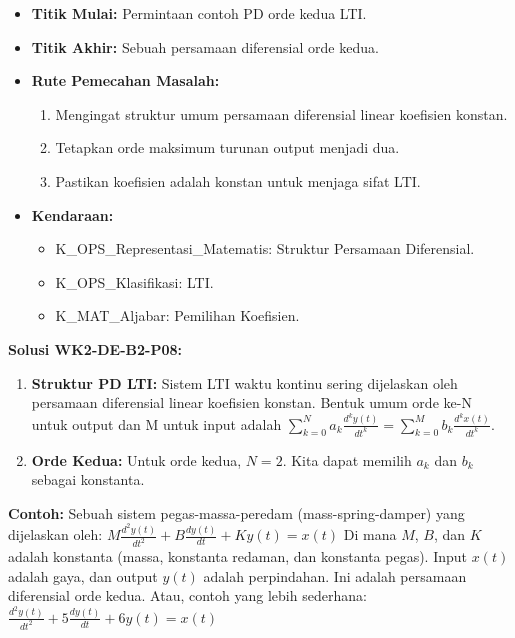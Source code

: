 \documentclass[
  letterpaper,
  DIV=11,
  numbers=noendperiod]{scrreprt}
\providecommand{\tightlist}{%
  \setlength{\itemsep}{0pt}\setlength{\parskip}{0pt}}
\begin{document}
\begin{itemize}
\tightlist
\item
  \textbf{Titik Mulai:} Permintaan contoh PD orde kedua LTI.
\item
  \textbf{Titik Akhir:} Sebuah persamaan diferensial orde kedua.
\item
  \textbf{Rute Pemecahan Masalah:}

  \begin{enumerate}
  \def\labelenumi{\arabic{enumi}.}
  \tightlist
  \item
    Mengingat struktur umum persamaan diferensial linear koefisien
    konstan.
  \item
    Tetapkan orde maksimum turunan output menjadi dua.
  \item
    Pastikan koefisien adalah konstan untuk menjaga sifat LTI.
  \end{enumerate}
\item
  \textbf{Kendaraan:}

  \begin{itemize}
  \tightlist
  \item
    K\_OPS\_Representasi\_Matematis: Struktur Persamaan Diferensial.
  \item
    K\_OPS\_Klasifikasi: LTI.
  \item
    K\_MAT\_Aljabar: Pemilihan Koefisien.
  \end{itemize}
\end{itemize}

\textbf{Solusi WK2-DE-B2-P08:}

\begin{enumerate}
\def\labelenumi{\arabic{enumi}.}
\tightlist
\item
  \textbf{Struktur PD LTI:} Sistem LTI waktu kontinu sering dijelaskan
  oleh persamaan diferensial linear koefisien konstan. Bentuk umum orde
  ke-N untuk output dan M untuk input adalah
  \(\sum_{k=0}^{N} a_k \frac{d^k y(t)}{dt^k} = \sum_{k=0}^{M} b_k \frac{d^k x(t)}{dt^k}\).
\item
  \textbf{Orde Kedua:} Untuk orde kedua, \(N=2\). Kita dapat memilih
  \(a_k\) dan \(b_k\) sebagai konstanta.
\end{enumerate}

\textbf{Contoh:} Sebuah sistem pegas-massa-peredam (mass-spring-damper)
yang dijelaskan oleh:
\(M \frac{d^2 y(t)}{dt^2} + B \frac{dy(t)}{dt} + K y(t) = x(t)\) Di mana
\(M\), \(B\), dan \(K\) adalah konstanta (massa, konstanta redaman, dan
konstanta pegas). Input \(x(t)\) adalah gaya, dan output \(y(t)\) adalah
perpindahan. Ini adalah persamaan diferensial orde kedua. Atau, contoh
yang lebih sederhana:
\(\frac{d^2 y(t)}{dt^2} + 5 \frac{dy(t)}{dt} + 6 y(t) = x(t)\)
\end{document}
